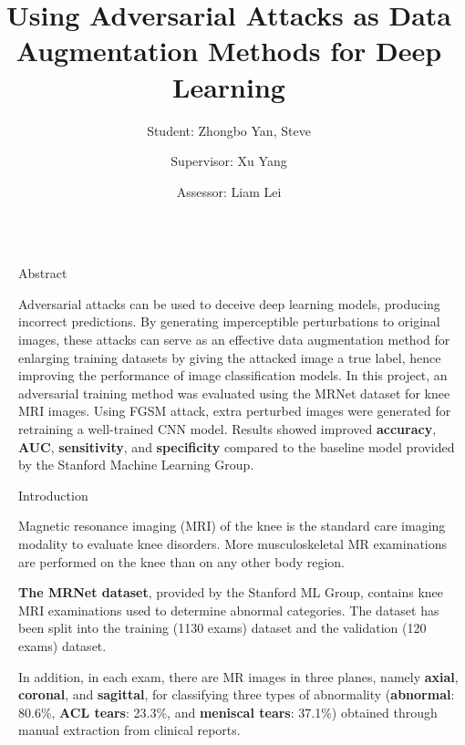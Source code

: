 \documentclass[final]{beamer}
\title{Using Adversarial Attacks as Data Augmentation Methods for Deep Learning}
\author{Student: Zhongbo Yan, Steve \and Supervisor: Xu Yang \and Assessor: Liam Lei}
\institute[shortinst]{Bachelor of Science in Computing (2022-2023) \samelineand Macao Polytechnic University \and Email: P1908326@mpu.edu.mo | me@aspires.cc}
\newlength{\sepwidth}
\newlength{\colwidth}
\newcommand{\separatorcolumn}{\begin{column}{\sepwidth}\end{column}}
\begin{document}

\begin{frame}[t]
\begin{columns}[t]
\separatorcolumn

\begin{column}{\colwidth}

  \begin{block}{Abstract}

    Adversarial attacks can be used to deceive deep learning models, producing incorrect predictions. By generating imperceptible perturbations to original images, these attacks can serve as an effective data augmentation method for enlarging training datasets by giving the attacked image a true label, hence improving the performance of image classification models. In this project, an adversarial training method was evaluated using the MRNet dataset for knee MRI images. Using FGSM attack, extra perturbed images were generated for retraining a well-trained CNN model. Results showed improved \textbf{accuracy}, \textbf{AUC}, \textbf{sensitivity}, and \textbf{specificity} compared to the baseline model provided by the Stanford Machine Learning Group.

    
  \end{block}
  \begin{block}{Introduction}

    Magnetic resonance imaging (MRI) of the knee is the standard care imaging modality to evaluate knee disorders. More musculoskeletal MR examinations are performed on the knee than on any other body region. 
    
    \textbf{The MRNet dataset}, provided by the Stanford ML Group, contains knee MRI examinations used to determine abnormal categories. The dataset has been split into the training (1130 exams) dataset and the validation (120 exams) dataset. 
    
    In addition, in each exam, there are MR images in three planes, namely \textbf{axial}, \textbf{coronal}, and \textbf{sagittal}, for classifying three types of abnormality (\textbf{abnormal}: 80.6\%, \textbf{ACL tears}: 23.3\%, and \textbf{meniscal tears}: 37.1\%) obtained through manual extraction from clinical reports.
    

\end{block}
\end{column}
\end{columns}
\end{frame}
\end{document}
